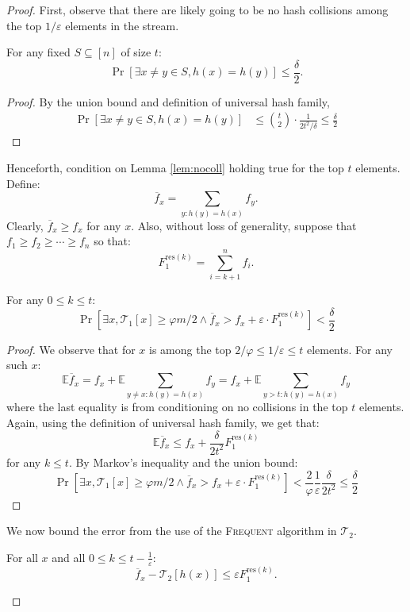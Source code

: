 \documentclass[sigconf,review=true,anonymous=true,screen]{acmart}
\newcommand{\eps}{\varepsilon}
\renewcommand{\phi}{\varphi}
\begin{document}
\begin{proof}
First, observe that there are likely going to be no hash collisions among the top $1/\eps$ elements in the stream.	
\begin{lemma}\label{lem:nocoll}
For any fixed $S \subseteq [n]$ of size $t$:
$$\Pr[\exists x \neq y \in S, h(x) = h(y)] \leq \frac{\delta}{2}.$$
\end{lemma}
\begin{proof}
By the union bound and definition of universal hash family,
\begin{align*}
\Pr[\exists x \neq y \in S, h(x) = h(y)] &\leq {t \choose 2} \cdot \frac{1}{2t^2/\delta} \leq \frac{\delta}{2} 
\end{align*}
\end{proof}
Henceforth, condition on Lemma \ref{lem:nocoll} holding true for the top $t$ elements. Define:
$$\overline{f}_x=\sum_{y:h(y)=h(x)}f_y.$$
Clearly, $\overline{f}_x \geq f_x$ for any $x$.
Also, without loss of generality, suppose that $f_1 \geq f_2 \geq \cdots \geq f_n$ so that:
$$F^{\text{res}(k)}_1=\sum_{i=k+1}^n f_{i}.$$
\begin{lemma}\label{lem:flb}
For any $0 \leq k \leq t$:
$$\Pr[\exists x, \mathcal{T}_1[x] \geq \phi m/2 \wedge \overline{f}_x > f_x +\eps \cdot F_1^{\text{res}(k)}] < \frac{\delta}{2}$$
\end{lemma}
\begin{proof}
We observe that for $x$ is among the top $2/\phi \leq 1/\eps \leq t$ elements. For any such $x$:
\begin{equation*}
\mathbb{E} \overline{f}_x = f_x + \mathbb{E} \sum_{y \neq x: h(y)=h(x)} f_y
 = f_x + \mathbb{E} \sum_{y > t: h(y)=h(x)} f_y
\end{equation*}
where the last equality is from conditioning on no collisions in the top $t$ elements. Again, using the definition of universal hash family, we get that:
$$\mathbb{E} \overline{f}_x \leq f_x + \frac{\delta}{2t^2} F_1^{\text{res}(k)}$$
for any $k \leq t$. By Markov's inequality and the union bound:
$$\Pr[\exists x, \mathcal{T}_1[x] \geq \phi m/2 \wedge \overline{f}_x > f_x +\eps \cdot F_1^{\text{res}(k)}] < \frac{2}{\varphi} \frac{1}{\eps} \frac{\delta}{2t^2} \leq \frac{\delta}{2}$$
\end{proof}
We now bound the error from the use of the \textsc{Frequent} algorithm in $\mathcal{T}_2$.
\begin{lemma}\label{lem:fub}
For all $x$ and all $0 \leq k \leq t-\frac{1}{\eps}$:
$$\overline{f}_x - \mathcal{T}_2[h(x)] \leq \eps F_1^{\text{res}(k)}.$$

\end{lemma}
\end{proof}
\end{document}
